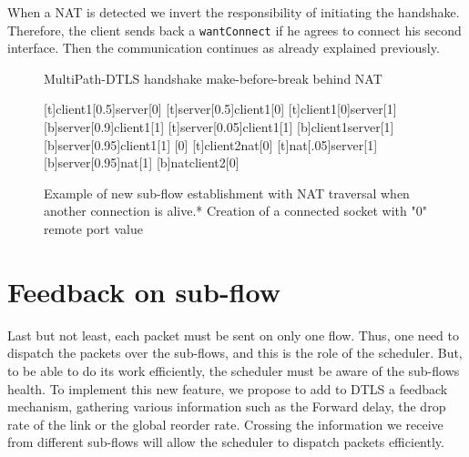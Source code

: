 When a NAT is detected we invert the responsibility of initiating the handshake. Therefore, the client sends back a \texttt{wantConnect} if he agrees to connect his second interface. Then the communication continues as already explained previously. 

\begin{figure}[!h]
\centering
\begin{msc}[r]{MultiPath-DTLS handshake make-before-break behind NAT}

\setlength{\instfootheight}{0em}
\setlength{\instheadheight}{0em}
\setlength{\instdist}{0.25\linewidth}
\setlength{\levelheight}{3em}


[t]{client1}[0.5]{server}[0]
\nextlevel
{}[t]{server}[0.5]{client1}[0]
\nextlevel
{}[t]{client1}[0]{server}[1]
\nextlevel
{}[b]{server}[0.9]{client1}[1]
\nextlevel[2]
[t]{server}[0.05]{client1}[1]
\nextlevel
{}
[b]{client1}{server}[1]
\nextlevel
{}[b]{server}[0.95]{client1}[1]
\nextlevel
{}
[0]
\nextlevel
{}[t]{client2}{nat}[0]
[t]{nat}[.05]{server}[1]
\nextlevel
{}[b]{server}[0.95]{nat}[1]
\nextlevel
{}[b]{nat}{client2}[0]
\nextlevel[2]
\end{msc}
\caption{Example of new sub-flow establishment with NAT traversal when another connection is alive.\newline{}* Creation of a connected socket with "0" remote port value }
\label{fig:HandshakeNAT}
\end{figure}

\newpage
\section{Feedback on sub-flow}
\label{sec:mpdtls-feedback}

Last but not least, each packet must be sent on only one flow. Thus, one need to dispatch the packets over the sub-flows, and this is the role of the scheduler. But, to be able to do its work efficiently, the scheduler must be aware of the sub-flows health. To implement this new feature, we propose to add to DTLS a feedback mechanism, gathering various information such as the Forward delay, the drop rate of the link or the global reorder rate. Crossing the information we receive from different sub-flows will allow the scheduler to dispatch packets efficiently.

